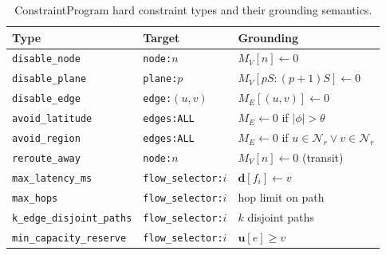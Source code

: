 \begin{table}[t]
\centering
\caption{ConstraintProgram hard constraint types and their grounding semantics.}
\label{tab:constraint_types}
\begin{tabular}{@{}lll@{}}
\toprule
\textbf{Type} & \textbf{Target} & \textbf{Grounding} \\
\midrule
\texttt{disable\_node} & \texttt{node:$n$} & $M_V[n] \leftarrow 0$ \\
\texttt{disable\_plane} & \texttt{plane:$p$} & $M_V[pS{:}(p{+}1)S] \leftarrow 0$ \\
\texttt{disable\_edge} & \texttt{edge:$(u,v)$} & $M_E[(u,v)] \leftarrow 0$ \\
\texttt{avoid\_latitude} & \texttt{edges:ALL} & $M_E \leftarrow 0$ if $|\phi| > \theta$ \\
\texttt{avoid\_region} & \texttt{edges:ALL} & $M_E \leftarrow 0$ if $u{\in}\mathcal{N}_r {\lor} v{\in}\mathcal{N}_r$ \\
\texttt{reroute\_away} & \texttt{node:$n$} & $M_V[n] \leftarrow 0$ (transit) \\
\texttt{max\_latency\_ms} & \texttt{flow\_selector:$i$} & $\mathbf{d}[f_i] \leftarrow v$ \\
\texttt{max\_hops} & \texttt{flow\_selector:$i$} & hop limit on path \\
\texttt{k\_edge\_disjoint\_paths} & \texttt{flow\_selector:$i$} & $k$ disjoint paths \\
\texttt{min\_capacity\_reserve} & \texttt{flow\_selector:$i$} & $\mathbf{u}[e] \geq v$ \\
\bottomrule
\end{tabular}
\end{table}
